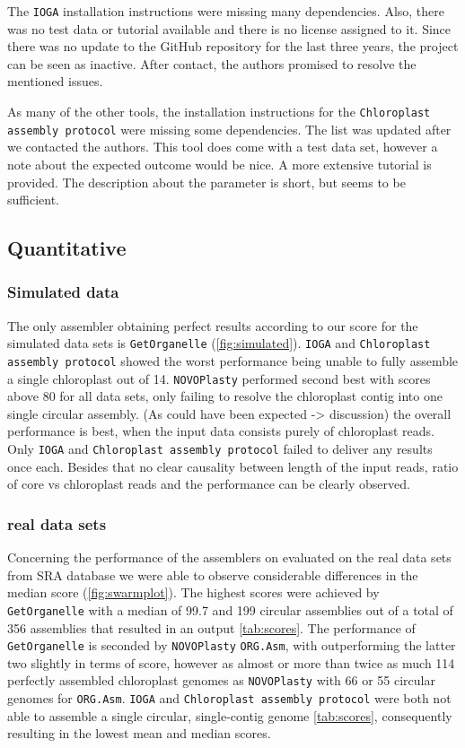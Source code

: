 \documentclass{bmcart}
\newcommand{\formatprogramnames}[1]{\texttt{#1}}
\newcommand{\oa}{\formatprogramnames{ORG.Asm}}
\newcommand{\ioga}{\formatprogramnames{IOGA}}
\newcommand{\np}{\formatprogramnames{NOVOPlasty}}
\newcommand{\go}{\formatprogramnames{GetOrganelle}}
\newcommand{\cassp}{\formatprogramnames{Chloroplast assembly protocol}}
\begin{document}
The \ioga{} installation instructions were missing many dependencies. Also, there was no test data or tutorial available and there is no license assigned to it. Since there was no update to the GitHub repository for the last three years, the project can be seen as inactive. After contact, the authors promised to resolve the mentioned issues.

As many of the other tools, the installation instructions for the \cassp{} were missing some dependencies. The list was updated after we contacted the authors. This tool does come with a test data set, however a note about the expected outcome would be nice. A more extensive tutorial is provided. The description about the parameter is short, but seems to be sufficient.

\subsection*{Quantitative}
\subsubsection*{Simulated data}
The only assembler obtaining perfect results according to our score for the simulated data sets is \go{} (\cref{fig:simulated}).
\ioga{} and \cassp{} showed the worst performance being unable to fully assemble a single chloroplast out of \num{14}.
\np{} performed second best with scores above \num{80} for all data sets, only failing to resolve the chloroplast contig into one single circular assembly.
(As could have been expected -> discussion) the overall performance is best, when the input data consists purely of chloroplast reads.
Only \ioga{} and \cassp{} failed to deliver any results once each.
Besides that no clear causality between length of the input reads, ratio of core vs chloroplast reads and the performance can be clearly observed. 

\subsubsection*{real data sets}
Concerning the performance of the assemblers on evaluated on the real data sets from SRA database we were able to observe considerable differences in the median score (\cref{fig:swarmplot}).
The highest scores were achieved by \go{} with a median of 99.7 and 199 circular assemblies out of a total of 356 assemblies that resulted in an output  \cref{tab:scores}.
The performance of \go{} is seconded by \fb{} \np{} \oa{}, with \fb{} outperforming the latter two slightly in terms of score, however \fb{} as almost or more than twice as much \num{114} perfectly assembled chloroplast genomes as \np{} with \num{66} or \num{55} circular genomes for \oa{}.
\ioga{} and \cassp{} were both not able to assemble a single circular, single-contig genome \cref{tab:scores}, consequently resulting in the lowest mean and median scores.  
\end{document}
